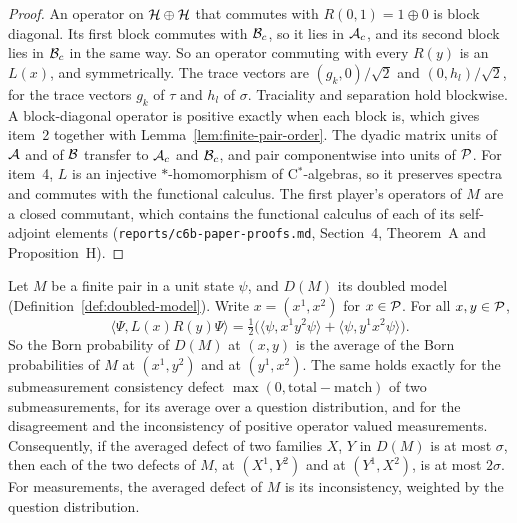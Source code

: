 \begin{proof}
\leanok
An operator on $\mH \oplus \mH$ that commutes with $R(0, 1) = 1 \oplus 0$ is block diagonal. Its
first block commutes with $\cal{B}_c$, so it lies in $\cal{A}_c$, and its second block lies in
$\cal{B}_c$ in the same way. So an operator commuting with every $R(y)$ is an $L(x)$, and
symmetrically. The trace vectors are $(g_k, 0)/\sqrt{2}$ and $(0, h_l)/\sqrt{2}$, for the trace
vectors $g_k$ of $\tau$ and $h_l$ of $\sigma$. Traciality and separation hold blockwise. A
block-diagonal operator is positive exactly when each block is, which gives item~2 together with
Lemma~\ref{lem:finite-pair-order}. The dyadic matrix units of $\cal{A}$ and of $\cal{B}$ transfer to
$\cal{A}_c$ and $\cal{B}_c$, and pair componentwise into units of $\cal{P}$. For item~4, $L$ is an
injective $*$-homomorphism of C$^*$-algebras, so it preserves spectra and commutes with the
functional calculus. The first player's operators of $M$ are a closed commutant, which contains the
functional calculus of each of its self-adjoint elements (\texttt{reports/c6b-paper-proofs.md},
Section~4, Theorem~A and Proposition~H).
\end{proof}

\begin{lemma}
\label{lem:doubled-model-role-average}
\leanok
Let $M$ be a finite pair in a unit state $\psi$, and $D(M)$ its doubled model
(Definition~\ref{def:doubled-model}). Write $x = (x^1, x^2)$ for $x \in \cal{P}$. For all $x, y \in
\cal{P}$,
\[
  \langle \Psi, L(x) R(y) \Psi \rangle = \tfrac{1}{2} \bigl( \langle \psi, x^1 y^2 \psi \rangle +
  \langle \psi, y^1 x^2 \psi \rangle \bigr).
\]
So the Born probability of $D(M)$ at $(x, y)$ is the average of the Born probabilities of $M$ at
$(x^1, y^2)$ and at $(y^1, x^2)$. The same holds exactly for the submeasurement consistency defect
$\max(0, \mathrm{total} - \mathrm{match})$ of two submeasurements, for its average over a question
distribution, and for the disagreement and the inconsistency of positive operator valued
measurements. Consequently, if the averaged defect of two families $X$, $Y$ in $D(M)$ is at most
$\sigma$, then each of the two defects of $M$, at $(X^1, Y^2)$ and at $(Y^1, X^2)$, is at most
$2\sigma$. For measurements, the averaged defect of $M$ is its inconsistency, weighted by the
question distribution.
\end{lemma}

